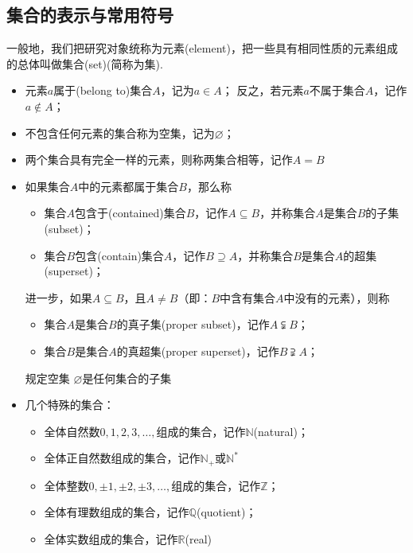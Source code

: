   \subsection{集合的表示与常用符号}
    一般地，我们把研究对象统称为{\fangsong 元素}(element)，把一些具有相同性质的元素组成的总体叫做{\fangsong 集合}(set)(简称为{\fangsong 集}).
    \begin{itemize}
      \item 元素$a${\fangsong 属于}(belong to)集合$A$，记为$a\in A$；
        反之，若元素$a${\fangsong 不属于}集合$A$，记作$a\notin A$；
      \item 不包含任何元素的集合称为{\fangsong 空集}，记为$\varnothing$；
      \item 两个集合具有完全一样的元素，则称两集合{\fangsong 相等}，记作$A=B$
      \item 如果集合$A$中的元素都属于集合$B$，那么称
        \begin{itemize}
          \item 集合$A${\fangsong 包含于}(contained)集合$B$，记作$A\subseteq B$，并称集合$A$是集合$B$的{\fangsong 子集}(subset)；
          \item 集合$B${\fangsong 包含}(contain)集合$A$，记作$B\supseteq A$，并称集合$B$是集合$A$的{\fangsong 超集}(superset)；
        \end{itemize}
        进一步，如果$A\subseteq B$，且$A\neq B$（即：$B$中含有集合$A$中没有的元素），则称
          \begin{itemize}
            \item 集合$A$是集合$B$的{\fangsong 真子集}(proper subset)，记作$A\subsetneqq B$；
            \item 集合$B$是集合$A$的{\fangsong 真超集}(proper superset)，记作$B\supsetneqq A$；
          \end{itemize}
        {\kaishu
          规定空集 $\varnothing$是任何集合的子集
          }
      \item 几个特殊的集合：
        \begin{itemize}
          \item 全体{\fangsong 自然数}$0,1,2,3,\ldots ,$组成的集合，记作$\mathbb{N}$(natural)；
          \item 全体正自然数组成的集合，记作$\mathbb{N}_+$或$\mathbb{N}^*$
          \item 全体{\fangsong 整数}$0,\pm1,\pm2,\pm3,\ldots ,$组成的集合，记作$\mathbb{Z}$；
          \item 全体{\fangsong 有理数}组成的集合，记作$\mathbb{Q}$(quotient)；
          \item 全体{\fangsong 实数}组成的集合，记作$\mathbb{R}$(real)

\end{itemize}
\end{itemize}
